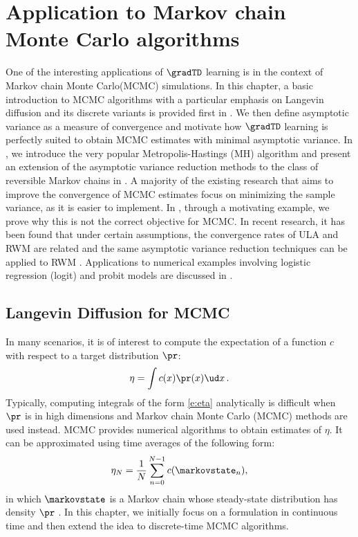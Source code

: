 \chapter{Application to Markov chain Monte Carlo algorithms}
\label{ch:mcmc}
One of the interesting applications of $\gradTD$ learning is in the context of Markov chain Monte Carlo(MCMC) simulations. In this chapter, a basic introduction to MCMC algorithms with a particular emphasis on Langevin diffusion and its discrete variants is provided first in . We then define asymptotic variance as a measure of convergence and motivate how $\gradTD$ learning is perfectly suited to obtain MCMC estimates with minimal asymptotic variance. In , we introduce the very popular Metropolis-Hastings (MH) algorithm and present an extension of the asymptotic variance reduction methods to the class of reversible Markov chains in . A majority of the existing research that aims to improve the convergence of MCMC estimates focus on minimizing the sample variance, as it is easier to implement. In , through a motivating example, we prove why this is not the correct objective for MCMC. 
In recent research, it has been found that under certain assumptions, the convergence rates of ULA and RWM are related and the same asymptotic variance reduction techniques can be applied to RWM \cite{brodurmeymourad18}.  Applications to numerical examples involving logistic regression (logit) and probit models are discussed in . 

\section{Langevin Diffusion for MCMC}
\label{s:mcmc_langevin}
In many scenarios, it is of interest to compute the expectation of a function $c$ with respect to a target distribution $\pr$:
\begin{equation}
\eta = \int c(x)\pr(x)\ud x\, .
\label{e:eta}
\end{equation} 
Typically, computing integrals of the form \eqref{e:eta} analytically is difficult when $\pr$ is in high dimensions and Markov chain Monte Carlo (MCMC) methods are used instead. MCMC provides numerical algorithms to obtain estimates of $\eta$. It can be approximated using time averages of the following form:
\begin{equation}
\eta_N =\frac{1}{N}\sum_{n=0}^{N-1} c(\markovstate_n),
\label{e:sample_mean_HM}
\end{equation}
in which $\boldsymbol{\markovstate}$ is a Markov chain whose steady-state distribution has density $\pr$ \cite{asmgly07,MT}.
In this chapter, we initially focus on a formulation in continuous time and then extend the idea to discrete-time MCMC algorithms.

